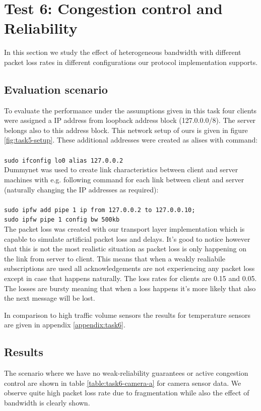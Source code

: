 \chapter{Test 6: Congestion control and Reliability}
In this section we study the effect of heterogeneous bandwidth with different
packet loss rates in different configurations our protocol implementation supports.

\section{Evaluation scenario}
To evaluate the performance under the assumptions given in this task four clients
were assigned a IP address from loopback address block (127.0.0.0/8). The server
belongs also to this address block. This network setup of ours is given in
figure \ref{fig:task5-setup}.  These additional addresses were created as
alises with command:\\
\\
\texttt{sudo ifconfig lo0 alias 127.0.0.2}
\\

Dummynet was used to create link characteristics between client and server
machines with e.g. following command for each link between client and server
(naturally changing the IP addresses as required): \\ 
\\
\texttt{sudo ipfw add pipe 1 ip from 127.0.0.2 to 127.0.0.10; \\sudo ipfw pipe 1 config bw 500kb }
\\
The packet loss was created with our transport layer implementation which is
capable to simulate artificial packet loss and delays. It's good to notice
however that this is not the most realistic situation as packet loss is only
happening on the link from server to client. This means that when a weakly
realiabile subscriptions are used all acknowledgements are not experiencing any
packet loss except in case that happens naturally. The loss rates for clients
are 0.15 and 0.05. The losses are bursty meaning that when a loss happens it's
more likely that also the next message will be lost.

In comparison to high traffic volume sensors the results for temperature sensors
are given in appendix \ref{appendix:task6}.

\section{Results}
The scenario where we have no weak-reliability guarantees or active congestion
control are shown in table \ref{table:task6-camera-a} for camera sensor data. We
observe quite high packet loss rate due to fragmentation while also the effect
of bandwidth is clearly shown.

